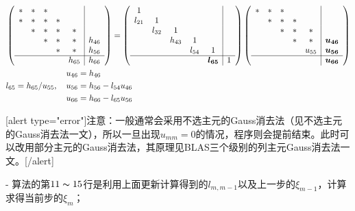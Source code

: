 \documentclass[UTF8,nofonts]{ctexart}
\begin{document}
\begin{eqnarray*}
& \left(\begin{array}{ccccc|c}
\ast & \ast & \ast & ~ & ~ & ~ \\
\ast & \ast & \ast & \ast & ~ & ~ \\
~ & \ast & \ast & \ast & \ast & ~ \\
~ & ~ & \ast & \ast & \ast & h_{46} \\
~ & ~ & ~ & \ast & \ast & h_{56} \\
\cline{1-6}
~ & ~ & ~ & ~ & h_{65} & h_{66} \\
\end{array}\right)=
\left(\begin{array}{ccccc|c}
1 & ~ & ~ & ~ & ~ & ~ \\
l_{21} & 1 & ~ & ~ & ~ & ~ \\
~ & l_{32} & 1 & ~ & ~ & ~ \\
~ & ~ & h_{43} & 1 & ~ & ~ \\
~ & ~ & ~ & l_{54} & 1 & ~ \\
\cline{1-6}
& & & & \boldsymbol{l_{65}} & 1 \\
\end{array}\right)
\left(\begin{array}{ccccc|c}
\ast & \ast & \ast & ~ & ~ & ~ \\
~ & \ast & \ast & \ast & ~ & ~ \\
~ & ~ & \ast & \ast & \ast & ~ \\
~ & ~ & ~ & \ast & \ast & \boldsymbol{u_{46}} \\
~ & ~ & ~ & ~ & u_{55} & \boldsymbol{u_{56}} \\
\cline{1-6}
~ & ~ & ~ & ~ & ~ & \boldsymbol{u_{66}} \\
\end{array}\right) \\
& l_{65}=h_{65}/u_{55},\quad\begin{aligned}
u_{46}&=h_{46} \\
u_{56}&=h_{56}-l_{54}u_{46} \\
u_{66}&=h_{66}-l_{65}u_{56}
\end{aligned}
\end{eqnarray*}

[alert type="error"]注意：一般通常会采用不选主元的Gauss消去法（见不选主元的Gauss消去法一文），所以一旦出现$u_{mm}=0$的情况，程序则会提前结束。此时可以改用部分主元的Gauss消去法，其原理见BLAS三个级别的列主元Gauss消去法一文。[/alert]

- 算法的第$11\thicksim15$行是利用上面更新计算得到的$l_{m,m-1}$以及上一步的$\xi_{m-1}$，计算求得当前步的$\xi_m$；
\end{document}
